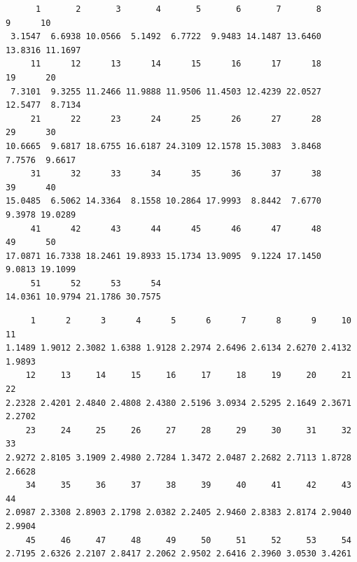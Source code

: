 \documentclass[
]{book}
\newenvironment{Shaded}{\begin{snugshade}}{\end{snugshade}}
\newcommand{\DataTypeTok}[1]{\textcolor[rgb]{0.13,0.29,0.53}{#1}}
\newcommand{\DecValTok}[1]{\textcolor[rgb]{0.00,0.00,0.81}{#1}}
\newcommand{\KeywordTok}[1]{\textcolor[rgb]{0.13,0.29,0.53}{\textbf{#1}}}
\newcommand{\NormalTok}[1]{#1}
\newcommand{\OperatorTok}[1]{\textcolor[rgb]{0.81,0.36,0.00}{\textbf{#1}}}
\newcommand{\StringTok}[1]{\textcolor[rgb]{0.31,0.60,0.02}{#1}}
\begin{document}
\begin{verbatim}
      1       2       3       4       5       6       7       8       9      10 
 3.1547  6.6938 10.0566  5.1492  6.7722  9.9483 14.1487 13.6460 13.8316 11.1697 
     11      12      13      14      15      16      17      18      19      20 
 7.3101  9.3255 11.2466 11.9888 11.9506 11.4503 12.4239 22.0527 12.5477  8.7134 
     21      22      23      24      25      26      27      28      29      30 
10.6665  9.6817 18.6755 16.6187 24.3109 12.1578 15.3083  3.8468  7.7576  9.6617 
     31      32      33      34      35      36      37      38      39      40 
15.0485  6.5062 14.3364  8.1558 10.2864 17.9993  8.8442  7.6770  9.3978 19.0289 
     41      42      43      44      45      46      47      48      49      50 
17.0871 16.7338 18.2461 19.8933 15.1734 13.9095  9.1224 17.1450  9.0813 19.1099 
     51      52      53      54 
14.0361 10.9794 21.1786 30.7575 
\end{verbatim}

\begin{Shaded}
\end{Shaded}

\begin{verbatim}
     1      2      3      4      5      6      7      8      9     10     11 
1.1489 1.9012 2.3082 1.6388 1.9128 2.2974 2.6496 2.6134 2.6270 2.4132 1.9893 
    12     13     14     15     16     17     18     19     20     21     22 
2.2328 2.4201 2.4840 2.4808 2.4380 2.5196 3.0934 2.5295 2.1649 2.3671 2.2702 
    23     24     25     26     27     28     29     30     31     32     33 
2.9272 2.8105 3.1909 2.4980 2.7284 1.3472 2.0487 2.2682 2.7113 1.8728 2.6628 
    34     35     36     37     38     39     40     41     42     43     44 
2.0987 2.3308 2.8903 2.1798 2.0382 2.2405 2.9460 2.8383 2.8174 2.9040 2.9904 
    45     46     47     48     49     50     51     52     53     54 
2.7195 2.6326 2.2107 2.8417 2.2062 2.9502 2.6416 2.3960 3.0530 3.4261 
\end{verbatim}

\begin{Shaded}
\end{Shaded}
\end{document}
